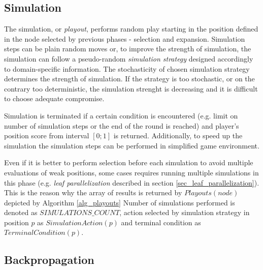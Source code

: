 \subsection{Simulation}
\label{sec_simulation}

\begin{algorithm}
\DontPrintSemicolon
\caption{$Playouts(node)$\label{alg_playouts}}
\end{algorithm}

The simulation, or \emph{playout}, performs random play starting in the position defined in the
node selected by previous phases - selection and expansion. Simulation steps can be plain
random moves or, to improve the strength of
simulation, the simulation can follow a pseudo-random \emph{simulation strategy} designed accordingly to
domain-specific information. The stochasticity of chosen simulation strategy determines the strength
of simulation. If the strategy is too stochastic, or on the contrary too deterministic, the
simulation strenght is decreasing and it is difficult to choose adequate compromise.

Simulation is terminated if a certain condition is encountered (e.g. limit on number of simulation
steps or the end of the round is reached) and player's position score from interval $[0;1]$ is
returned. Additionally, to speed up the simulation the simulation steps can be performed in
simplified game environment.

Even if it is better to perform selection before each simulation to avoid multiple 
evaluations of weak positions, some cases requires running multiple simulations in this phase
(e.g. \emph{leaf parallelization} described in section \ref{sec_leaf_parallelization}). This is
the reason why the array of results is returned by $Playouts(node)$ depicted by Algorithm
\ref{alg_playouts} Number of simulations performed is denoted as $SIMULATIONS\_COUNT$, action
selected by simulation strategy in position $p$ as $SimulationAction(p)$ and terminal condition
as $TerminalCondition(p)$.


\subsection{Backpropagation}

